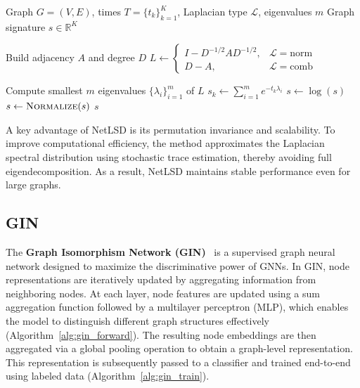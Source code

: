 \begin{algorithm}[t]
\footnotesize
\caption{NetLSD (Heat Trace Signature)}
\label{alg:netlsd}
\begin{algorithmic}[1]
\Require Graph $G=(V,E)$, times $T=\{t_k\}_{k=1}^K$, Laplacian type $\mathcal{L}$, eigenvalues $m$
\Ensure Graph signature $s \in \mathbb{R}^K$

\State Build adjacency $A$ and degree $D$
\State $L \gets \begin{cases}
I - D^{-1/2}AD^{-1/2}, & \mathcal{L}=\text{norm} \\
D-A, & \mathcal{L}=\text{comb}
\end{cases}$

\State Compute smallest $m$ eigenvalues $\{\lambda_i\}_{i=1}^m$ of $L$
  \State $s_k \gets \sum_{i=1}^m e^{-t_k\lambda_i}$
\EndFor
\State $s \gets \log(s)$ 
\State $s \gets \textsc{Normalize}(s)$ 
\State \Return $s$
\end{algorithmic}
\end{algorithm}


A key advantage of NetLSD is its permutation invariance and scalability. 
To improve computational efficiency, the method approximates the Laplacian spectral distribution 
using stochastic trace estimation, thereby avoiding full eigendecomposition. 
As a result, NetLSD maintains stable performance even for large graphs.
\subsection{GIN}
The \textbf{Graph Isomorphism Network (GIN)}~\cite{xu2019gin} is a supervised graph neural network designed to maximize 
the discriminative power of GNNs. 
In GIN, node representations are iteratively updated by aggregating information from neighboring nodes. 
At each layer, node features are updated using a sum aggregation function followed by a multilayer perceptron (MLP), 
which enables the model to distinguish different graph structures effectively (Algorithm~\ref{alg:gin_forward}). 
The resulting node embeddings are then aggregated via a global pooling operation to obtain a graph-level representation. 
This representation is subsequently passed to a classifier and trained end-to-end using labeled data 
(Algorithm~\ref{alg:gin_train}).

